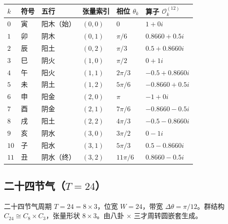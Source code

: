 \begin{center}
\begin{tabular}{>{\centering\arraybackslash}p{1cm}>{\centering\arraybackslash}p{1.2cm}>{\centering\arraybackslash}p{1.5cm}>{\centering\arraybackslash}p{1.8cm}>{\centering\arraybackslash}p{2cm}>{\centering\arraybackslash}p{3.5cm}}
\toprule
$k$ & 符号 & 五行 & 张量索引 & 相位 $\theta_k$ & 算子 $\mathcal{O}_k^{(12)}$ \\
\midrule
$0$ & 寅 & 阳木（始） & $(0,0)$ & $0$ & $1+0i$ \\
$1$ & 卯 & 阴木 & $(0,1)$ & $\pi/6$ & $0.8660+0.5i$ \\
$2$ & 辰 & 阳土 & $(0,2)$ & $\pi/3$ & $0.5+0.8660i$ \\
$3$ & 巳 & 阴火 & $(1,0)$ & $\pi/2$ & $0+1i$ \\
$4$ & 午 & 阳火 & $(1,1)$ & $2\pi/3$ & $-0.5+0.8660i$ \\
$5$ & 未 & 阴土 & $(1,2)$ & $5\pi/6$ & $-0.8660+0.5i$ \\
$6$ & 申 & 阳金 & $(2,0)$ & $\pi$ & $-1+0i$ \\
$7$ & 酉 & 阴金 & $(2,1)$ & $7\pi/6$ & $-0.8660-0.5i$ \\
$8$ & 戌 & 阳土 & $(2,2)$ & $4\pi/3$ & $-0.5-0.8660i$ \\
$9$ & 亥 & 阴水 & $(3,0)$ & $3\pi/2$ & $0-1i$ \\
$10$ & 子 & 阳水 & $(3,1)$ & $5\pi/3$ & $0.5-0.8660i$ \\
$11$ & 丑 & 阴水（终） & $(3,2)$ & $11\pi/6$ & $0.8660-0.5i$ \\
\bottomrule
\end{tabular}
\end{center}

\subsection{\texorpdfstring{二十四节气（$T=24$）}{二十四节气（T=24）}}

\begin{definition}[二十四节气相位算子]\label{def:jieqi_operators}
二十四节气周期 $T=24=8 \times 3$，位宽 $W=24$，带宽 $\Delta\theta=\pi/12$。群结构 $C_{24} \cong C_8 \times C_3$，张量形状 $8 \times 3$。由八卦 $\times$ 三才周转圆嵌套生成。
\end{definition}

